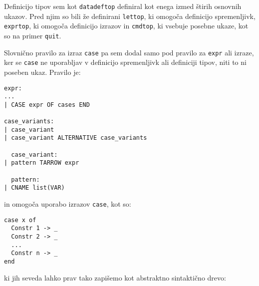 \documentclass[12pt,a4paper,openany]{book}
\begin{document}
Definicijo tipov sem kot \lstinline{datadeftop} definiral kot enega izmed štirih osnovnih ukazov. Pred njim so bili že definirani \lstinline{lettop}, ki omogoča definicijo 
spremenljivk, \lstinline{exprtop}, ki omogoča definicijo izrazov in \lstinline{cmdtop}, ki vsebuje posebne ukaze, kot so na primer \lstinline{quit}.

Slovnično pravilo za izraz \lstinline{case} pa sem dodal samo pod pravilo za \lstinline{expr} ali izraze, ker se \lstinline{case} ne uporabljav v definicijo spremenljivk ali
definiciji tipov, niti to ni poseben ukaz. Pravilo je: 
\begin{lstlisting}
expr:
...
| CASE expr OF cases END

case_variants:
| case_variant
| case_variant ALTERNATIVE case_variants

  case_variant:
| pattern TARROW expr

  pattern:
| CNAME list(VAR)
\end{lstlisting}
in omogoča uporabo izrazov \lstinline{case}, kot so:
\begin{lstlisting}
case x of 
  Constr 1 -> _
  Constr 2 -> _
  ...
  Constr n -> _
end
\end{lstlisting}
ki jih seveda lahko prav tako zapišemo kot abstraktno sintaktično drevo:
\begin{center}
\end{center}
\end{document}
